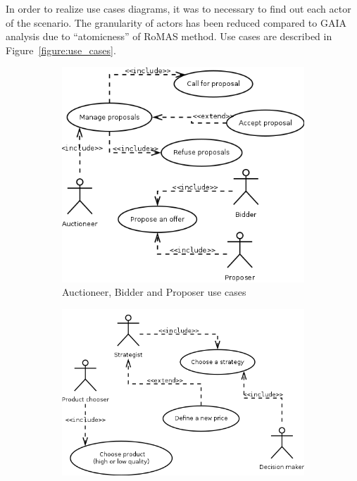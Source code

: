 \documentclass[a4paper,11pt]{report}
\begin{document}
  
  In order to realize use cases diagrams, it was to necessary to find out each actor 
  of the scenario. The granularity of actors has been reduced compared to GAIA analysis 
  due to ``atomicness'' of RoMAS method. Use cases are described in Figure~\ref{figure:use_cases}.
  
  \begin{figure}[ht!]
    \begin{subfigure}{0.5\textwidth}
       \centering
       \includegraphics[width=\textwidth]{media/use_cases_1.png}
       \caption{Auctioneer, Bidder and Proposer use cases}
       \label{figure:use_cases_1}
    \end{subfigure}
    \begin{subfigure}{0.5\textwidth}
       \centering
       \includegraphics[width=\textwidth]{media/use_cases_2.png}

\end{subfigure}
\end{figure}
\end{document}
